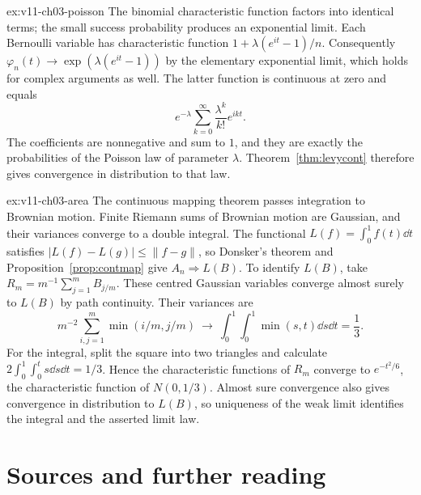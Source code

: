 \begin{solution}{ex:v11-ch03-poisson}
\idea The binomial characteristic function factors into identical terms; the small success probability produces an exponential limit.
\writeup Each Bernoulli variable has characteristic function $1+\lambda(e^{it}-1)/n$. Consequently $\varphi_n(t)\to\exp(\lambda(e^{it}-1))$ by the elementary exponential limit, which holds for complex arguments as well. The latter function is continuous at zero and equals
\[
e^{-\lambda}\sum_{k=0}^\infty\frac{\lambda^k}{k!}e^{ikt}.
\]
The coefficients are nonnegative and sum to $1$, and they are exactly the probabilities of the Poisson law of parameter $\lambda$. Theorem~\ref{thm:levycont} therefore gives convergence in distribution to that law.
\end{solution}

\begin{solution}{ex:v11-ch03-area}
\idea The continuous mapping theorem passes integration to Brownian motion. Finite Riemann sums of Brownian motion are Gaussian, and their variances converge to a double integral.
\writeup The functional $L(f)=\int_0^1 f(t)\dd t$ satisfies $|L(f)-L(g)|\le\|f-g\|$, so Donsker's theorem and Proposition~\ref{prop:contmap} give $A_n\Rightarrow L(B)$. To identify $L(B)$, take $R_m=m^{-1}\sum_{j=1}^mB_{j/m}$. These centred Gaussian variables converge almost surely to $L(B)$ by path continuity. Their variances are
\[
m^{-2}\sum_{i,j=1}^m\min(i/m,j/m)
\ \longrightarrow\ \int_0^1\int_0^1\min(s,t)\dd s\dd t=\frac13.
\]
For the integral, split the square into two triangles and calculate $2\int_0^1\int_0^t s\dd s\dd t=1/3$. Hence the characteristic functions of $R_m$ converge to $e^{-t^2/6}$, the characteristic function of $N(0,1/3)$. Almost sure convergence also gives convergence in distribution to $L(B)$, so uniqueness of the weak limit identifies the integral and the asserted limit law.
\end{solution}

\section*{Sources and further reading}

